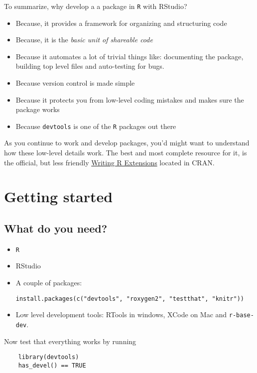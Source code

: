 \documentclass[pdftex,11pt,a4paper]{article}
\newcommand{\R}{\texttt{R} }
\begin{document}
To summarize, why develop a a package in \R with RStudio?
\begin{itemize}
	\item Because, it provides a framework for organizing and structuring code
	\item Because, it is the \textit{basic unit of shareable code}
	\item Because it automates a lot of trivial things like: documenting the package, building top level files and auto-testing for bugs.
	\item Because version control is made simple
	\item Because it protects you from low-level coding mistakes and makes sure the package works
	\item Because \verb|devtools| is one of the \R packages out there
\end{itemize}

As you continue to work and develop packages, you'd might want to understand how these low-level details work. The best and most complete resource for it, is the official, but less friendly \href{https://cran.r-project.org/doc/manuals/R-exts.html#Creating-R-packages}{Writing R Extensions} located in CRAN.

\section*{Getting started}
\subsection*{What do you need?}
\begin{itemize}
	\item \R
	\item RStudio
	\item A couple of packages: 

\begin{verbatim}
install.packages(c("devtools", "roxygen2", "testthat", "knitr"))
\end{verbatim}

	\item Low level development tools: RTools in windows, XCode on Mac and \verb|r-base-dev|.
\end{itemize}

Now test that everything works by running

\begin{verbatim}
	library(devtools)
	has_devel() == TRUE
\end{verbatim}
\end{document}

